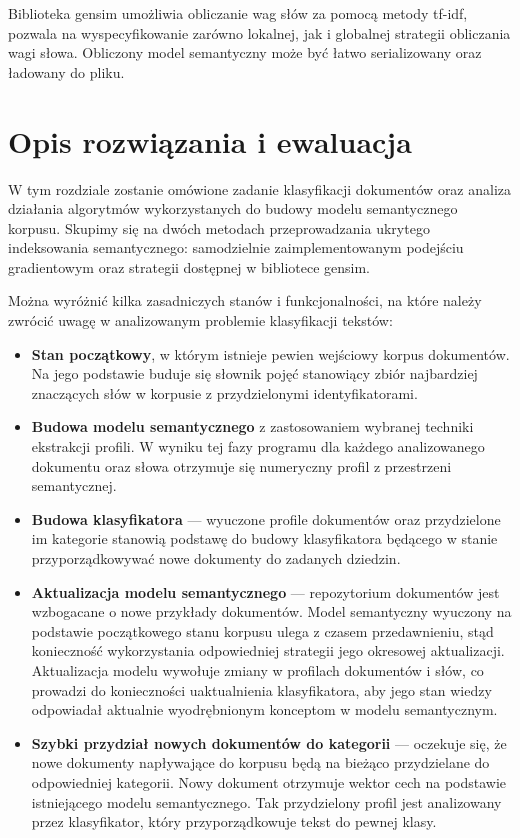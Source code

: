 \documentclass{pracamgr}
\begin{document}
Biblioteka gensim umożliwia obliczanie wag słów za pomocą metody tf-idf, pozwala na wyspecyfikowanie zarówno lokalnej, jak i globalnej strategii obliczania wagi słowa. Obliczony model semantyczny może być łatwo serializowany oraz ładowany do pliku.


\chapter{Opis rozwiązania i ewaluacja}

W tym rozdziale zostanie omówione zadanie klasyfikacji dokumentów oraz analiza działania algorytmów wykorzystanych do budowy modelu semantycznego korpusu. Skupimy się na dwóch metodach przeprowadzania ukrytego indeksowania semantycznego: samodzielnie zaimplementowanym podejściu gradientowym oraz strategii dostępnej w bibliotece gensim.

Można wyróżnić kilka zasadniczych stanów i funkcjonalności, na które należy zwrócić uwagę w analizowanym problemie klasyfikacji tekstów:

\begin{itemize}
    \item \textbf{Stan początkowy}, w którym istnieje pewien wejściowy korpus dokumentów. Na jego podstawie buduje się słownik pojęć stanowiący zbiór najbardziej znaczących słów w korpusie z przydzielonymi identyfikatorami.
    \item \textbf{Budowa modelu semantycznego} z zastosowaniem wybranej techniki ekstrakcji profili. W wyniku tej fazy programu dla każdego analizowanego dokumentu oraz słowa otrzymuje się numeryczny profil z przestrzeni semantycznej.
    \item \textbf{Budowa klasyfikatora} --- wyuczone profile dokumentów oraz przydzielone im kategorie stanowią podstawę do budowy klasyfikatora będącego w stanie przyporządkowywać nowe dokumenty do zadanych dziedzin.
    \item \textbf{Aktualizacja modelu semantycznego} --- repozytorium dokumentów jest wzbogacane o nowe przykłady dokumentów. Model semantyczny wyuczony na podstawie początkowego stanu korpusu ulega z czasem przedawnieniu, stąd konieczność wykorzystania odpowiedniej strategii jego okresowej aktualizacji. Aktualizacja modelu wywołuje zmiany w profilach dokumentów i słów, co prowadzi do konieczności uaktualnienia klasyfikatora, aby jego stan wiedzy odpowiadał aktualnie wyodrębnionym konceptom w modelu semantycznym.
    \item \textbf{Szybki przydział nowych dokumentów do kategorii} --- oczekuje się, że nowe dokumenty napływające do korpusu będą na bieżąco przydzielane do odpowiedniej kategorii. Nowy dokument otrzymuje wektor cech na podstawie istniejącego modelu semantycznego. Tak przydzielony profil jest analizowany przez klasyfikator, który przyporządkowuje tekst do pewnej klasy.
    
\end{itemize}
\end{document}
